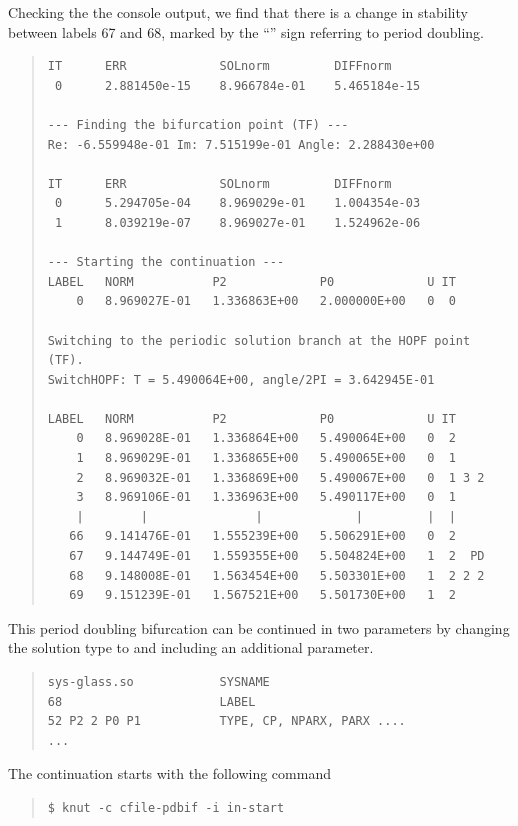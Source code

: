 \documentclass[10pt,a4paper]{ddedoc}
\begin{document}
Checking the the console output, we find that there is a change in
stability between labels 67 and 68, marked by the ``'' sign referring
to period doubling.
{ \small \begin{quote} \begin{lstlisting}[basicstyle=\tt,frame=single]
IT      ERR             SOLnorm         DIFFnorm
 0      2.881450e-15    8.966784e-01    5.465184e-15

--- Finding the bifurcation point (TF) ---
Re: -6.559948e-01 Im: 7.515199e-01 Angle: 2.288430e+00

IT      ERR             SOLnorm         DIFFnorm
 0      5.294705e-04    8.969029e-01    1.004354e-03
 1      8.039219e-07    8.969027e-01    1.524962e-06

--- Starting the continuation ---
LABEL   NORM           P2             P0             U IT
    0   8.969027E-01   1.336863E+00   2.000000E+00   0  0

Switching to the periodic solution branch at the HOPF point (TF).
SwitchHOPF: T = 5.490064E+00, angle/2PI = 3.642945E-01

LABEL   NORM           P2             P0             U IT
    0   8.969028E-01   1.336864E+00   5.490064E+00   0  2
    1   8.969029E-01   1.336865E+00   5.490065E+00   0  1
    2   8.969032E-01   1.336869E+00   5.490067E+00   0  1 3 2
    3   8.969106E-01   1.336963E+00   5.490117E+00   0  1
    |        |               |             |         |  |
   66   9.141476E-01   1.555239E+00   5.506291E+00   0  2
   67   9.144749E-01   1.559355E+00   5.504824E+00   1  2  PD
   68   9.148008E-01   1.563454E+00   5.503301E+00   1  2 2 2
   69   9.151239E-01   1.567521E+00   5.501730E+00   1  2
\end{lstlisting} \end{quote} } \noindent
This period doubling bifurcation can be continued in two parameters 
by changing the solution type to  and including an additional
parameter.
{ \small \begin{quote} \begin{lstlisting}[basicstyle=\tt,frame=single]
sys-glass.so            SYSNAME
68                      LABEL
52 P2 2 P0 P1           TYPE, CP, NPARX, PARX ....
...
\end{lstlisting} \end{quote} } \noindent
The continuation starts with the following command
{ \small \begin{quote} \begin{lstlisting}[basicstyle=\tt,frame=single]
$ knut -c cfile-pdbif -i in-start
\end{lstlisting} \end{quote} } \noindent
\end{document}

